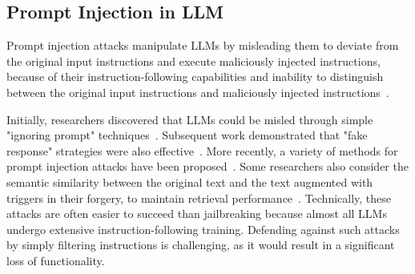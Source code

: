 \subsection{Prompt Injection in LLM}
Prompt injection attacks manipulate LLMs by misleading them to deviate from the original input instructions and execute maliciously injected instructions, because of their instruction-following capabilities and inability to distinguish between the original input instructions and maliciously injected instructions~\citep{prompt_injection_1,prompt_injection_2}.

Initially, researchers discovered that LLMs could be misled through simple "ignoring prompt" techniques~\citep{prompt_injection_ignore}. Subsequent work demonstrated that "fake response" strategies were also effective~\citep{prompt_injection_fake_response}. More recently, a variety of methods for prompt injection attacks have been proposed~\citep{prompt_injection_multiple}. Some researchers also consider the semantic similarity between the original text and the text augmented with triggers in their forgery, to maintain retrieval performance~\citep{Neural_exec}.
Technically, these attacks are often easier to succeed than jailbreaking because almost all LLMs undergo extensive instruction-following training. Defending against such attacks by simply filtering instructions is challenging, as it would result in a significant loss of functionality.